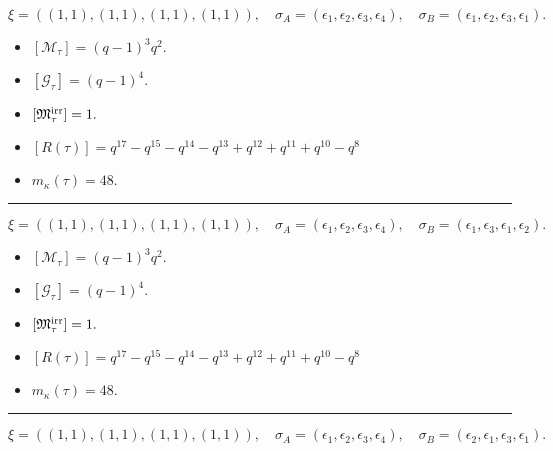 \documentclass[10pt,a4paper]{amsart}
\begin{document}
$$\xi = ({(1, 1)}, {(1, 1)}, {(1, 1)}, {(1, 1)}),\quad \sigma_A = ({{\epsilon_1}}, {{\epsilon_2}}, {{\epsilon_3}}, {{\epsilon_4}}),\quad \sigma_B = ({{\epsilon_1}}, {{\epsilon_2}}, {{\epsilon_3}}, {{\epsilon_1}}).$$

\begin{itemize}
 \item $[\mathcal{M}_{\tau}] = {\left(q - 1\right)}^{3} q^{2} .$

 \item $[\mathcal{G}_{\tau}] = {\left(q - 1\right)}^{4} .$

 \item $[{\frak M}_{\tau}^{\textrm{irr}}] = 1 .$

 \item $[R(\tau)] = q^{17} - q^{15} - q^{14} - q^{13} + q^{12} + q^{11} + q^{10} - q^{8} $

 \item $m_{\kappa}(\tau) = 48 .$

 \end{itemize}
\noindent\rule{8cm}{0.4pt}

$$\xi = ({(1, 1)}, {(1, 1)}, {(1, 1)}, {(1, 1)}),\quad \sigma_A = ({{\epsilon_1}}, {{\epsilon_2}}, {{\epsilon_3}}, {{\epsilon_4}}),\quad \sigma_B = ({{\epsilon_1}}, {{\epsilon_3}}, {{\epsilon_1}}, {{\epsilon_2}}).$$

\begin{itemize}
 \item $[\mathcal{M}_{\tau}] = {\left(q - 1\right)}^{3} q^{2} .$

 \item $[\mathcal{G}_{\tau}] = {\left(q - 1\right)}^{4} .$

 \item $[{\frak M}_{\tau}^{\textrm{irr}}] = 1 .$

 \item $[R(\tau)] = q^{17} - q^{15} - q^{14} - q^{13} + q^{12} + q^{11} + q^{10} - q^{8} $

 \item $m_{\kappa}(\tau) = 48 .$

 \end{itemize}
\noindent\rule{8cm}{0.4pt}

$$\xi = ({(1, 1)}, {(1, 1)}, {(1, 1)}, {(1, 1)}),\quad \sigma_A = ({{\epsilon_1}}, {{\epsilon_2}}, {{\epsilon_3}}, {{\epsilon_4}}),\quad \sigma_B = ({{\epsilon_2}}, {{\epsilon_1}}, {{\epsilon_3}}, {{\epsilon_1}}).$$
\end{document}
